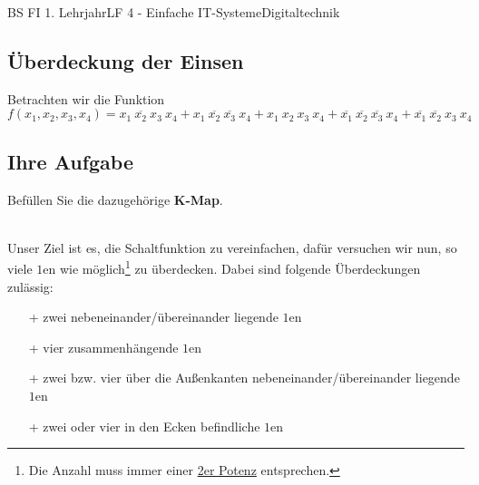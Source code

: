 \documentclass[11pt,twocolumn,oneside,openany,headings=optiontotoc,11pt,numbers=noenddot]{article}
\begin{document}
\begin{worksheet}{BS FI 1. Lehrjahr}{LF 4 - Einfache IT-Systeme}{Digitaltechnik}
		\subsection{Überdeckung der Einsen} Betrachten wir die Funktion\\
		\(f(x_1,x_2,x_3,x_4) = x_1\ \overline{x_2}\ x_3\ x_4 + x_1\ \overline{x_2}\ \overline{x_3}\ x_4 + x_1\ x_2\ x_3\ x_4 + \overline{x_1}\ \overline{x_2}\ \overline{x_3}\ x_4 + \overline{x_1}\ \overline{x_2}\ x_3\ x_4\)
		\subsection*{Ihre Aufgabe} Befüllen Sie die dazugehörige \textbf{K-Map}.
		\begin{karnaugh-map}[4][4][1][$x_3x_4$][$x_1x_2$]
			
		\end{karnaugh-map}\\
		Unser Ziel ist es, die Schaltfunktion zu vereinfachen, dafür versuchen wir nun, so viele \(1\)en wie möglich\footnote{Die Anzahl muss immer einer \underline{2er Potenz} entsprechen.} zu überdecken. Dabei sind folgende Überdeckungen zulässig:
		\begin{itemize}
			\item[+] zwei nebeneinander/übereinander liegende \(1\)en
			\item[+] vier zusammenhängende \(1\)en
			\item[+] zwei bzw. vier über die Außenkanten nebeneinander/übereinander liegende \(1\)en
			\item[+] zwei oder vier in den Ecken befindliche \(1\)en
		\end{itemize}
		\begin{karnaugh-map}[4][4][1][$x_2x_1$][$x_4x_3$]
		\end{karnaugh-map}
		\begin{karnaugh-map}[4][4][1][$x_2x_1$][$x_4x_3$]
		\end{karnaugh-map}
		\begin{karnaugh-map}[4][4][1][$x_2x_1$][$x_4x_3$]
		\end{karnaugh-map}
		\begin{karnaugh-map}[4][4][1][$x_2x_1$][$x_4x_3$]
		\end{karnaugh-map}
		\begin{karnaugh-map}[4][4][1][$x_2x_1$][$x_4x_3$]
			\implicantcorner
		\end{karnaugh-map}

\end{worksheet}
\end{document}
